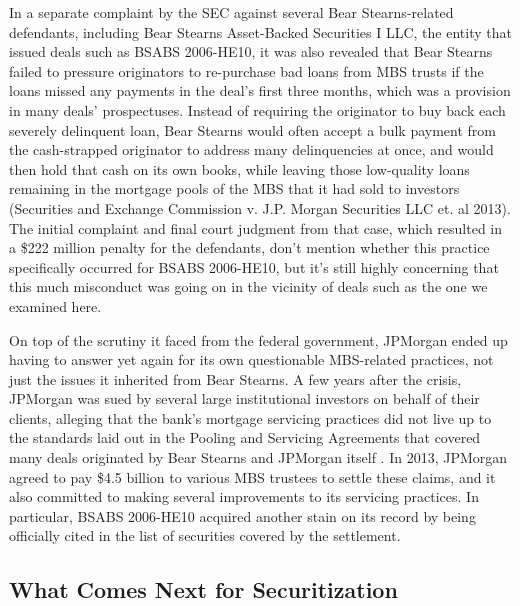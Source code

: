 \documentclass[12pt]{article}
\begin{document}
In a separate complaint by the SEC against several Bear Stearns-related defendants, including Bear Stearns Asset-Backed Securities I LLC, the entity that issued deals such as BSABS 2006-HE10, it was also revealed that Bear Stearns failed to pressure originators to re-purchase bad loans from MBS trusts if the loans missed any payments in the deal’s first three months, which was a provision in many deals’ prospectuses. Instead of requiring the originator to buy back each severely delinquent loan, Bear Stearns would often accept a bulk payment from the cash-strapped originator to address many delinquencies at once, and would then hold that cash on its own books, while leaving those low-quality loans remaining in the mortgage pools of the MBS that it had sold to investors (Securities and Exchange Commission v. J.P. Morgan Securities LLC et. al 2013). The initial complaint and final court judgment from that case, which resulted in a \$222 million penalty for the defendants, don’t mention whether this practice specifically occurred for BSABS 2006-HE10, but it’s still highly concerning that this much misconduct was going on in the vicinity of deals such as the one we examined here.

On top of the scrutiny it faced from the federal government, JPMorgan ended up having to answer yet again for its own questionable MBS-related practices, not just the issues it inherited from Bear Stearns. A few years after the crisis, JPMorgan was sued by several large institutional investors on behalf of their clients, alleging that the bank’s mortgage servicing practices did not live up to the standards laid out in the Pooling and Servicing Agreements that covered many deals originated by Bear Stearns and JPMorgan itself \parencite{gibbs13}. In 2013, JPMorgan agreed to pay \$4.5 billion to various MBS trustees to settle these claims, and it also committed to making several improvements to its servicing practices. In particular, BSABS 2006-HE10 acquired another stain on its record by being officially cited in the list of securities covered by the settlement.


\subsection*{What Comes Next for Securitization}
\end{document}
